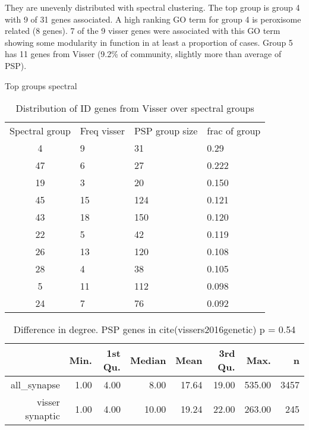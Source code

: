 They are unevenly distributed with spectral clustering. The top group is group 4 with 9 of 31 genes associated. A high ranking GO term for group 4 is peroxisome related (8 genes). 7 of the 9 visser genes were associated with this GO term showing some modularity in function in at least a proportion of cases. Group 5 has 11 genes from Visser (9.2\% of community, slightly more than average of PSP).

Top groups spectral
\begin{table}[ht]
\centering
\begin{tabular}{clll}
\hline
 Spectral group &Freq visser& PSP group size &frac of group\\
              4&           9 &            31&    0.29\\
          47  &         6   &          27  &  0.222\\
          19   &        3    &         20   & 0.150\\
         45    &      15     &       124 &   0.121\\
           43     &     18      &      150  &  0.120\\
           22      &     5       &      42   & 0.119\\
         26       &   13      &      120 &   0.108\\
        28       &    4     &        38  &  0.105\\
            5      &    11    &        112   & 0.098\\
          24     &      7   &          76 &   0.092\\
\end{tabular}
\caption{Distribution of ID genes from Visser over spectral groups}
\label{table:Distribution of ID genesw from Visser over spectral groups}
\end{table}


\begin{table}[ht]
\centering
\begin{tabular}{rrrrrrrr}
  \hline
 & Min. & 1st Qu. & Median & Mean & 3rd Qu. & Max. & n\\ 
  \hline
all\_synapse & 1.00 & 4.00 & 8.00 & 17.64 & 19.00 & 535.00 &3457\\ 
  visser synaptic & 1.00 & 4.00 & 10.00 & 19.24 & 22.00 & 263.00 & 245\\ 
   \hline
\end{tabular}
\caption{Difference in degree. PSP genes in cite(vissers2016genetic) p = 0.54}
\label{table:degree_visser}
\end{table}

